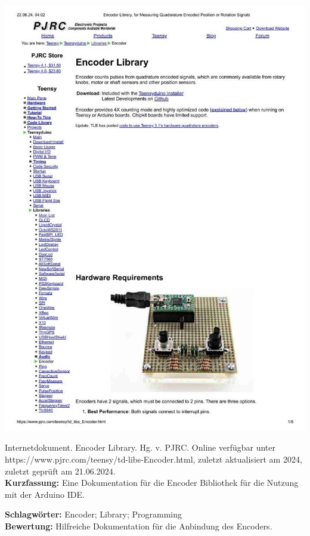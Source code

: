 {
	\begin{minipage}{0.38\textwidth}
		\includegraphics[width=\linewidth]{images/Stoffregen.jpg}
	\end{minipage}
	\hfill
	\begin{minipage}{0.6\textwidth}
		Internetdokument. Encoder Library. Hg. v. PJRC. Online verfügbar unter https://www.pjrc.com/teensy/td-libs-Encoder.html, zuletzt aktualisiert am 2024, zuletzt geprüft am 21.06.2024.
		\\ \textbf{Kurzfassung:}
		Eine Dokumentation für die Encoder Bibliothek für die Nutzung mit der Arduino IDE.
	\end{minipage}
	\textbf{Schlagwörter:}
	Encoder; Library; Programming
	\\ \textbf{Bewertung:}
	Hilfreiche Dokumentation für die Anbindung des Encoders.
}


